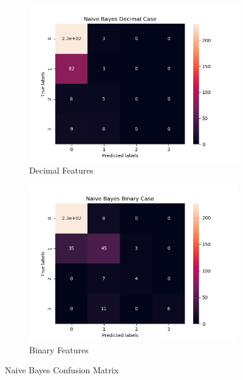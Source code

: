 \begin{figure}[H]
     \centering
     \hspace*{\fill}
     \begin{subfigure}[b]{0.35\textwidth}
         \centering
         \includegraphics[width=\textwidth]{../Figures/Naive Bayes Decimal Case_conf_mat.png}
         \caption{Decimal Features}
     \end{subfigure}
     \hfill
     \begin{subfigure}[b]{0.35\textwidth}
         \centering
         \includegraphics[width=\textwidth]{../Figures/Naive Bayes Binary Case_conf_mat.png}
         \caption{Binary Features}
     \end{subfigure}
     \hspace*{\fill}
     \caption{Naive Bayes Confusion Matrix}
\end{figure}

